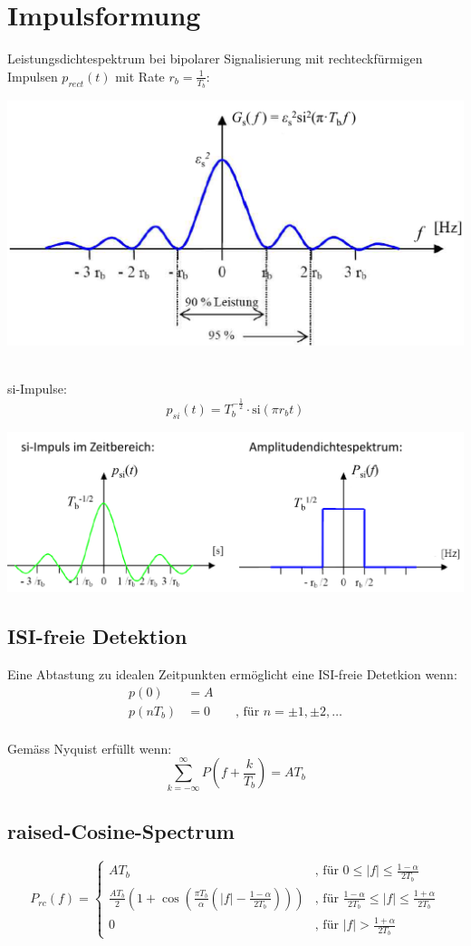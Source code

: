 \chapter{Impulsformung}
Leistungsdichtespektrum bei bipolarer Signalisierung mit rechteckfürmigen
Impulsen $p_{rect}(t)$ mit Rate $r_b=\frac{1}{T_b}$:

\begin{center}
	\includegraphics[width=.9\textwidth]{./images/grect}
\end{center}
~\\
si-Impulse:
\[
	p_{si}(t) = T_b^{-\frac{1}{2}} \cdot \textrm{si}(\pi r_b t)
\]
\begin{center}
	\includegraphics[width=.9\textwidth]{./images/si}
\end{center}

\section{ISI-freie Detektion}
Eine Abtastung zu idealen Zeitpunkten ermöglicht eine ISI-freie Detetkion wenn:
\[\begin{aligned}
	p(0) &= A\\
	p(nT_b) &= 0 \qquad \textrm{, für } n=\pm1,\pm2,\ldots	
\end{aligned}\]
~\\Gemäss Nyquist erfüllt wenn:
\[
	\sum_{k=-\infty}^{\infty} P\left(f+\frac{k}{T_b}\right) = AT_b
\]

\section{raised-Cosine-Spectrum}
\[
	P_{rc}(f) = \left\lbrace
	\begin{matrix}
		AT_b & \textrm{, für } 0 \leq |f| \leq \frac{1-\alpha}{2T_b} \\
		\frac{AT_b}{2}\left(1 + \cos\left( \frac{\pi T_b}{\alpha}
			\left(|f|-\frac{1-\alpha}{2T_b} \right)\right)\right)
			& \textrm{, für } \frac{1-\alpha}{2T_b} \leq |f| \leq \frac{1+\alpha}{2T_b} \\
			0 & \textrm{, für } |f| > \frac{1+\alpha}{2T_b}
	\end{matrix}
	\right.
\]


